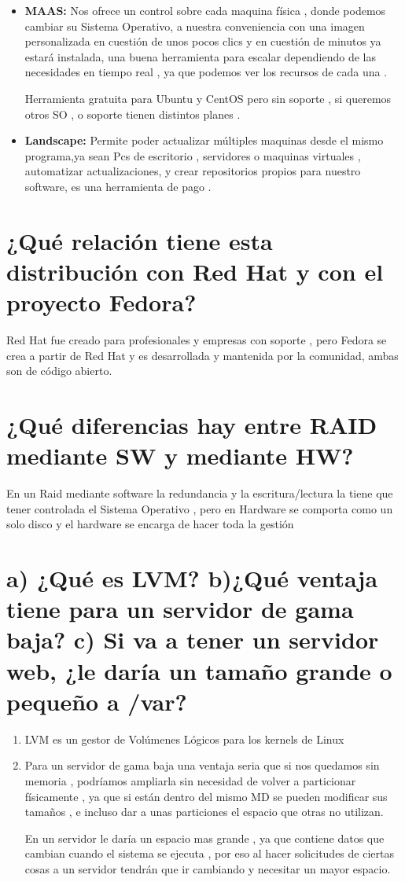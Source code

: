 \begin{itemize}
	\item \textbf{MAAS:} Nos ofrece un control sobre cada maquina física , donde podemos cambiar su Sistema Operativo, a nuestra conveniencia con una imagen personalizada en cuestión de unos pocos clics y en cuestión de minutos ya estará instalada, una buena herramienta para escalar dependiendo de las necesidades en tiempo real , ya que podemos ver los recursos de cada una . 
	
	Herramienta gratuita para Ubuntu y CentOS pero sin soporte , si queremos otros SO , o soporte tienen distintos planes \cite{maas}.
	
	\item \textbf{Landscape:} Permite poder actualizar múltiples maquinas desde el mismo programa,ya sean Pcs de escritorio , servidores o maquinas virtuales , automatizar actualizaciones, y crear repositorios propios para nuestro software, es una herramienta de pago \cite{landscape}.
\end{itemize}

\section{¿Qué relación tiene esta distribución con Red Hat y con el proyecto Fedora?}
Red Hat fue creado para profesionales y empresas con soporte , pero Fedora se crea a partir de Red Hat y es desarrollada y mantenida por la comunidad, ambas son de código abierto.
\section{¿Qué diferencias hay entre RAID mediante SW y mediante HW?}

En un Raid mediante software la redundancia y la escritura/lectura la tiene que tener controlada el Sistema Operativo , pero en Hardware se comporta como un solo disco y el hardware se encarga de hacer toda la gestión

\section{a) ¿Qué es LVM? b)¿Qué ventaja tiene para un servidor de gama baja? c) Si va a tener un servidor web, ¿le daría un tamaño grande o pequeño a /var?}

\begin{enumerate}[label=(\alph*)]
	\item LVM es un gestor de Volúmenes Lógicos para los kernels de Linux
	\item Para un servidor de gama baja una ventaja seria que si nos quedamos sin memoria , podríamos ampliarla sin necesidad de volver a particionar físicamente , ya que si están dentro del mismo MD se pueden modificar sus tamaños , e incluso dar a unas particiones el espacio que otras no utilizan.
	
	 En un servidor le daría un espacio mas grande , ya que contiene datos que cambian cuando el sistema se ejecuta , por eso al hacer solicitudes de ciertas cosas a un servidor tendrán que ir cambiando y necesitar un mayor espacio.
\end{enumerate}

